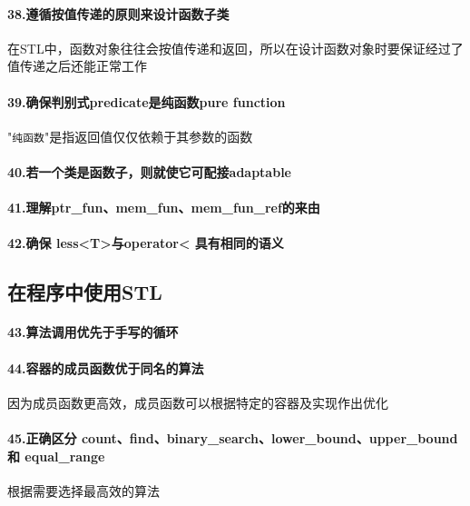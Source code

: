\documentclass[UTF8,a4paper,12pt]{ctexbook}
\begin{document}
			\paragraph{38.遵循按值传递的原则来设计函数子类} 在STL中，函数对象往往会按值传递和返回，所以在设计函数对象时要保证经过了值传递之后还能正常工作
			
			\paragraph{39.确保判别式predicate是纯函数pure function} "\verb|纯函数|"是指返回值仅仅依赖于其参数的函数
			\paragraph{40.若一个类是函数子，则就使它可配接adaptable}
			\paragraph{41.理解ptr\_fun、mem\_fun、mem\_fun\_ref的来由}
			\paragraph{42.确保 less<T>与operator< 具有相同的语义}
		\subsection{在程序中使用STL}
			\paragraph{43.算法调用优先于手写的循环}
			\paragraph{44.容器的成员函数优于同名的算法} 因为成员函数更高效，成员函数可以根据特定的容器及实现作出优化
			\paragraph{45.正确区分 count、find、binary\_search、lower\_bound、upper\_bound 和 equal\_range} 根据需要选择最高效的算法
				
\end{document}
